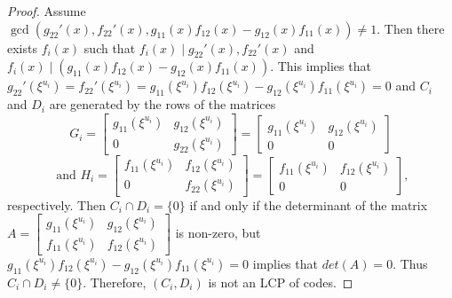 \documentclass[12 pt]{extarticle}
\numberwithin{equation}{section}
\theoremstyle{definition}
\begin{document}
\begin{proof}
 Assume $\gcd(g_{22}'(x),f_{22}'(x), g_{11}(x)f_{12}(x)-g_{12}(x)f_{11}(x))\neq 1$. Then there exists $f_i(x)$ such that $f_i(x)\mid g_{22}'(x), f_{22}'(x)$ and $f_i(x)\mid (g_{11}(x)f_{12}(x)-g_{12}(x)f_{11}(x)) $. This implies that $g_{22}'(\xi^{u_i})=f_{22}'(\xi^{u_i})=g_{11}(\xi^{u_i})f_{12}(\xi^{u_i})-g_{12}(\xi^{u_i})f_{11}(\xi^{u_i})=0$ and $C_i$ and $D_i$ are generated by the rows of the matrices 
 $$
G_i=\begin{bmatrix}
g_{11}(\xi^{u_i}) & g_{12}(\xi^{u_i}) \\
0 & g_{22}(\xi^{u_i}) 
\end{bmatrix}    = \begin{bmatrix}
g_{11}(\xi^{u_i}) & g_{12}(\xi^{u_i}) \\
0 & 0 
\end{bmatrix}$$
$$\text{ and } H_i=\begin{bmatrix}
f_{11}(\xi^{u_i}) & f_{12}(\xi^{u_i}) \\
0 & f_{22}(\xi^{u_i}) 
\end{bmatrix}    = \begin{bmatrix}
f_{11}(\xi^{u_i}) & f_{12}(\xi^{u_i}) \\
0 & 0  
\end{bmatrix},
$$ respectively. Then $C_i\cap D_i=\{0\}$ if and only if the determinant of the matrix $ A=\begin{bmatrix}
 g_{11}(\xi^{u_i}) & g_{12}(\xi^{u_i})\\ 
 f_{11}(\xi^{u_i}) & f_{12}(\xi^{u_i})
\end{bmatrix}$ is non-zero, but $g_{11}(\xi^{u_i})f_{12}(\xi^{u_i})-g_{12}(\xi^{u_i})f_{11}(\xi^{u_i})=0$ implies that $det(A)=0$. Thus $C_i\cap D_i\neq \{0\}$. Therefore, $(C_i,D_i)$ is not an LCP of codes.
\end{proof}
\end{document}
